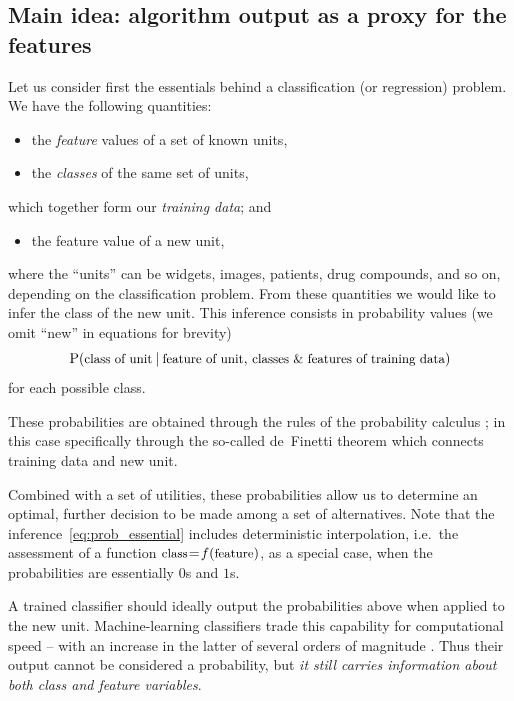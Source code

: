 \documentclass[\ifafour a4paper,12pt,\else a5paper,10pt,\fi%
onecolumn,oneside,article,%
british%
]{memoir}
\theoremstyle{remark}
\theoremstyle{innote}
\newcommand*{\amp}{\&}
\renewcommand*{\P}{\mathrm{P}}%
\renewcommand*{\|}[1][]{\nonscript\:#1\vert\nonscript\:\mathopen{}}
\newcommand*{\mo}[1][=]{\mathrel{\mkern-3.5mu#1\mkern-3.5mu}}
\newcommand*{\sect}{\S}%
\newcommand*{\chap}{ch.}%
\newcommand*{\chaps}{chs}%
\newcommand*{\eg}{{e.g.}}
\newcommand*{\ie}{{i.e.}}
\newcommand*{\texts}[1]{\text{\small #1}}
\begin{document}
\subsection{Main idea: algorithm output as a proxy for the features}
\label{sec:essential_idea}

Let us consider first the essentials behind a classification (or regression) problem. We have the following quantities:
\begin{itemize}
\item the \emph{feature} values of a set of known units,
\item the \emph{classes} of the same set of units,
\end{itemize}
which together form our \emph{training data}; and
\begin{itemize}[resume]
\item the feature value of a new unit,
\end{itemize}
where the \enquote{units} can be widgets, images, patients, drug compounds, and so on, depending on the classification problem. From these quantities we would like to infer the class of the new unit. This inference consists in probability values (we omit \enquote{new} in equations for brevity)
\begin{equation}
  \label{eq:prob_essential}
  \P(\texts{class of unit} \| \texts{feature of unit},\,
  \texts{classes \amp\ features of training data})
\end{equation}
for each possible class.

These probabilities are obtained through the rules of the probability calculus \autocites{jaynes1994_r2003}[\chaps~12--13]{russelletal1995_r2022}{gregory2005,hailperin2011,jeffreys1939_r1983}; in this case specifically through the so-called de~Finetti theorem \autocites[\chap~4]{bernardoetal1994_r2000}{dawid2013} which connects training data and new unit.

Combined with a set of utilities, these probabilities allow us to determine an optimal, further decision to be made among a set of alternatives. Note that the inference~\eqref{eq:prob_essential} includes deterministic interpolation, \ie\ the assessment of a function $\texts{class} \mo f(\texts{feature})$, as a special case, when the probabilities are essentially $0$s and $1$s.

A trained classifier should ideally output the probabilities above when applied to the new unit. Machine-learning classifiers trade this capability for computational speed -- with an increase in the latter of several orders of magnitude \autocites[to understand this trade-off in the case of neural-network classifiers see \eg][]{mackay1992,mackay1992b,mackay1992d}[\sect~16.5 esp.~16.5.7]{murphy2012}[see also the discussion by][]{selfetal1987}. Thus their output cannot be considered a probability, but \emph{it still carries information about both class and feature variables}.
\end{document}
